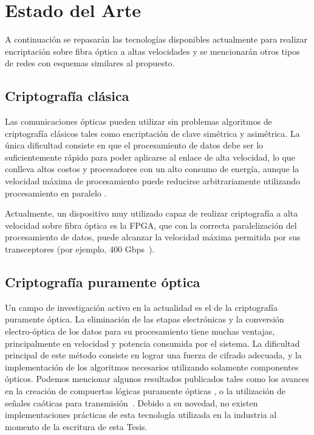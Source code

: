 \section{Estado del Arte}

A continuación se repasarán las tecnologías disponibles actualmente para realizar encriptación sobre fibra óptica a altas velocidades y se mencionarán otros tipos de redes con esquemas similares al propuesto.

\subsection{Criptografía clásica}
Las comunicaciones ópticas pueden utilizar sin problemas algoritmos de criptografía clásicos tales como encriptación de clave simétrica y asimétrica. La única dificultad consiste en que el procesamiento de datos debe ser lo suficientemente rápido para poder aplicarse al enlace de alta velocidad, lo que conlleva altos costos y procesadores con un alto consumo de energía, aunque la velocidad máxima de procesamiento puede reducirse arbitrariamente utilizando procesamiento en paralelo \cite{liforward}.

Actualmente, un dispositivo muy utilizado capaz de realizar criptografía a alta velocidad sobre fibra óptica es la FPGA, que con la correcta paralelización del procesamiento de datos, puede alcanzar la velocidad máxima permitida por sus transceptores (por ejemplo, 400 Gbps~\cite{Algotronix}).

\subsection{Criptografía puramente óptica}
\label{optocry}
Un campo de investigación activo en la actualidad es el de la criptografía puramente óptica. La eliminación de las etapas electrónicas y la conversión electro-óptica de los datos para su procesamiento tiene muchas ventajas, principalmente en velocidad y potencia consumida por el sistema.
La dificultad principal de este método consiste en lograr una fuerza de cifrado adecuada, y la implementación de los algoritmos necesarios utilizando solamente componentes ópticos. Podemos mencionar algunos resultados publicados tales como los avances en la creación de compuertas lógicas puramente ópticas \cite{jung2008demonstration}, o la utilización de señales caóticas para transmisión~\cite{liu2002synchronized}.
Debido a su novedad, no existen implementaciones prácticas de esta tecnología utilizada en la industria al momento de la escritura de esta Tesis.


